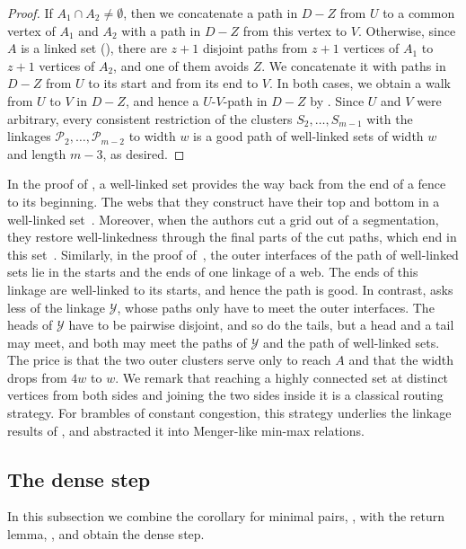 \documentclass[fontsize=12pt,leading=14pt]{fullpaper}
\newcommand{\Pcal}{\mathcal{P}}
\newcommand{\Ycal}{\mathcal{Y}}
\newcounter{step}
\begin{document}
\begin{proof}
  If $A_1\cap A_2\ne\emptyset$, then we concatenate a path in $D-Z$ from $U$ to a common vertex of $A_1$ and $A_2$ with a path in $D-Z$ from this vertex to $V$.
  Otherwise, since $A$ is a linked set (), there are $z+1$ disjoint paths from $z+1$ vertices of $A_1$ to $z+1$ vertices of $A_2$, and one of them avoids $Z$.
  We concatenate it with paths in $D-Z$ from $U$ to its start and from its end to $V$.
  In both cases, we obtain a walk from $U$ to $V$ in $D-Z$, and hence a $U$-$V$-path in $D-Z$ by .
  Since $U$ and $V$ were arbitrary, every consistent restriction of the clusters $S_2,\dots,S_{m-1}$ with the linkages $\Pcal_2,\dots,\Pcal_{m-2}$ to width $w$ is a good path of well-linked sets of width $w$ and length $m-3$, as desired.
\end{proof}

In the proof of \textcite{KawarabayashiK15}, a well-linked set provides the way back from the end of a fence to its beginning.
The webs that they construct have their top and bottom in a well-linked set~\cite[Theorem~4.2]{KawarabayashiK15}.
Moreover, when the authors cut a grid out of a segmentation, they restore well-linkedness through the final parts of the cut paths, which end in this set~\cite[Lemma~5.21]{KawarabayashiK15}.
Similarly, in the proof of~\cite[Theorem~9.9]{HKMM26a}, the outer interfaces of the path of well-linked sets lie in the starts and the ends of one linkage of a web.
The ends of this linkage are well-linked to its starts, and hence the path is good.
In contrast,  asks less of the linkage $\Ycal$, whose paths only have to meet the outer interfaces.
The heads of $\Ycal$ have to be pairwise disjoint, and so do the tails, but a head and a tail may meet, and both may meet the paths of $\Ycal$ and the path of well-linked sets.
The price is that the two outer clusters serve only to reach $A$ and that the width drops from $4w$ to $w$.
We remark that reaching a highly connected set at distinct vertices from both sides and joining the two sides inside it is a classical routing strategy.
For brambles of constant congestion, this strategy underlies the linkage results of \textcite{EMW17}, and \textcite{CCLS25} abstracted it into Menger-like min-max relations.

\subsection{The dense step}\label{sec:dense-step}

In this subsection we combine the corollary for minimal pairs, , with the return lemma, , and obtain the dense step.
\end{document}
